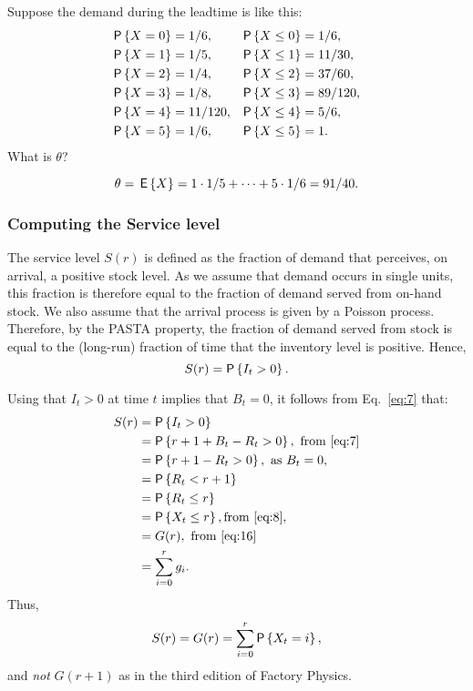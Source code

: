 \begin{question}\label{q:basestock}
  Suppose the demand during the leadtime is like this:
  \begin{align*}
    \P{X = 0} &= 1/6, & \P{X \leq 0} &= 1/6,  \\
    \P{X = 1} &= 1/5, & \P{X \leq 1} &= 11/30,  \\
    \P{X = 2} &= 1/4, & \P{X \leq 2} &= 37/60, \\
    \P{X = 3} &= 1/8, & \P{X \leq 3} &= 89/120, \\
    \P{X = 4} &= 11/120, & \P{X \leq 4} &= 5/6, \\
    \P{X = 5} &= 1/6, & \P{X \leq 5} &= 1.
  \end{align*}
What is $\theta$?
\end{question}
\begin{solution}
  \begin{equation*}
    \theta = \,\mathsf{E}\left\{X\right\} =
1\cdot 1/5 + \cdots + 5 \cdot 1/6 = 91/40.
  \end{equation*}
\end{solution}

\subsubsection{Computing the Service level}

The service level $S(r)$ is defined as the fraction of demand that
perceives, on arrival, a positive stock level. As we assume that demand
occurs in single units, this fraction is therefore equal to the fraction
of demand served from on-hand stock. We also assume that the arrival
process is given by a Poisson process. Therefore, by the PASTA property,
the fraction of demand served from stock is equal to the (long-run)
fraction of time that the inventory level is positive. Hence,
\begin{equation*}
   S(r) = \P{I_t >0}.
\end{equation*}

Using that $I_t>0$ at time $t$ implies that $B_t = 0$,
it follows from Eq.~\eqref{eq:7} that:
\begin{equation}\label{eq:10}
  \begin{split}
   S(r) &= \P{I_t >0} \\
   &= \P{r+1 + B_t - R_t >0}, \text{  from  \eqref{eq:7}}  \\
   &= \P{r+1 - R_t >0}, \text{ as } B_t = 0, \\
   &= \P{R_t < r+1} \\
   &= \P{R_t \leq r} \\
   & = \P{X_t \leq  r}, \text{from  \eqref{eq:8}}, \\
   &= G(r),  \text{ from \eqref{eq:16}} \\
   &=  \sum_{i=0}^{r} g_i.
  \end{split}
\end{equation}
Thus,
\begin{equation}
  \label{eq:13}
   S(r) = G(r) = \sum_{i=0}^r \P{X_t = i},
\end{equation}
and \emph{not} $G(r+1)$ as in the third edition of Factory Physics.


